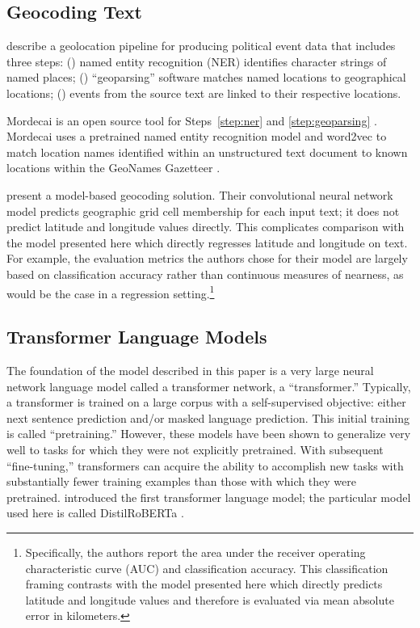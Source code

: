 \documentclass[11pt,a4paper]{article}
\begin{document}
\subsection{Geocoding Text}\label{sec:geocoding}

\citet{lee:liu:ward:2019} describe a geolocation pipeline for producing political event data that includes three steps:  (\thefoo)\label{step:ner} named entity recognition (NER) identifies character strings of named places; (\thefoo)\label{step:geoparsing} ``geoparsing'' software matches named locations to geographical locations; (\thefoo)\label{step:linking} events from the source text are linked to their respective locations.

Mordecai is an open source tool for Steps~\ref{step:ner} and \ref{step:geoparsing} \citep{halterman:2017}. Mordecai uses a pretrained named entity recognition model and word2vec \citep{mikolov:etal:2013} to match location names identified within an unstructured text document to known locations within the GeoNames Gazetteer \citep{geonames}. 

\citet{kulkarni:etal:2020} present a model-based geocoding solution. Their convolutional neural network model predicts geographic grid cell membership for each input text; it does not predict latitude and longitude values directly. This complicates comparison with the model presented here which directly regresses latitude and longitude on text. For example, the evaluation metrics the authors chose for their model are largely based on classification accuracy rather than continuous measures of nearness, as would be the case in a regression setting.\footnote{Specifically, the authors report the area under the receiver operating characteristic curve (AUC) and classification accuracy. This classification framing contrasts with the model presented here which directly predicts latitude and longitude values and therefore is evaluated via mean absolute error in kilometers.} 

\subsection{Transformer Language Models}

The foundation of the model described in this paper is a very large neural network language model called a transformer network, a ``transformer.'' Typically, a transformer is trained on a large corpus with a self-supervised objective: either next sentence prediction and/or masked language prediction. This initial training is called ``pretraining.''  However, these models have been shown to generalize very well to tasks for which they were not explicitly pretrained. With subsequent ``fine-tuning,'' transformers can acquire the ability to accomplish new tasks with substantially fewer training examples than those with which they were pretrained. \citet{vaswani:etal:2017} introduced the first transformer language model; the particular model used here is called DistilRoBERTa \citep{sanh:etal:2019, liu:etal:2019}.
\end{document}
